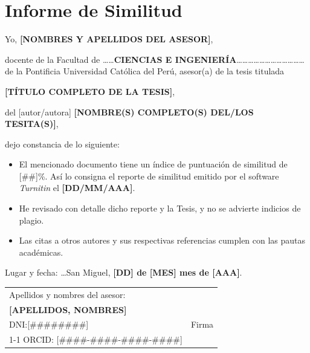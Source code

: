 \chapter*{Informe de Similitud}
\thispagestyle{unnumbered}  %

{\fontsize{10}{12}\selectfont
    \setlength{\parskip}{3pt}  %

    Yo, \textbf{[NOMBRES Y APELLIDOS DEL ASESOR]},

    docente de la Facultad de \ldots\ldots\textbf{CIENCIAS E INGENIERÍA}\ldots\ldots\ldots\ldots\ldots\ldots\ldots\ldots\ldots\ldots\ldots\ldots de la Pontificia Universidad Católica del Perú, asesor(a) de la tesis titulada

    \textbf{[TÍTULO COMPLETO DE LA TESIS]},

    del [autor/autora] \textbf{[NOMBRE(S) COMPLETO(S) DEL/LOS TESITA(S)]},

    dejo constancia de lo siguiente:

    \begin{itemize}
        \renewcommand\labelitemi{--}
        \setlength{\itemsep}{0pt}
        \setlength{\parskip}{0pt}
        \item El mencionado documento tiene un índice de puntuación de similitud de [\#\#]\%. Así lo consigna el reporte de similitud emitido por el software \textit{Turnitin} el \textbf{[DD/MM/AAA]}.
        \item He revisado con detalle dicho reporte y la Tesis, y no se advierte indicios de plagio.
        \item Las citas a otros autores y sus respectivas referencias cumplen con las pautas académicas.
    \end{itemize}

    Lugar y fecha: \ldots San Miguel, \textbf{[DD] de [MES] mes de [AAA]}.

    \noindent
    \begin{tabular}{|p{}|p{}|}
        \hline
        \multicolumn{2}{|l|}{Apellidos y nombres del asesor:} \\
        \multicolumn{2}{|l|}{\textbf{[APELLIDOS, NOMBRES]}} \\
        \hline
        DNI:[\#\#\#\#\#\#\#\#] & Firma \\
        \cline{1-1}
        ORCID: [\#\#\#\#-\#\#\#\#-\#\#\#\#-\#\#\#\#] & \\
        \hline
    \end{tabular}

}%
\clearpage
